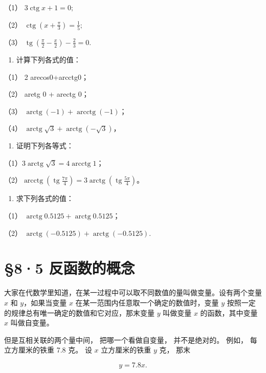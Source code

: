 （1） \(3 \operatorname{ctg} x + 1 = 0;\)

（2）
\(\operatorname{ctg}\left(x + \frac{\pi}{3}\right) = \frac{1}{5};\)

（3）
\(\operatorname{tg}\left(\frac{\pi}{2} - \frac{x}{2}\right) - \frac{2}{3} = 0.\)

\begin{enumerate}[start=3]
\item
  计算下列各式的值：
\end{enumerate}

（1） 2 arecos0+arcctg0；

（2） aretg 0 + arectg 0；

（3） \(\operatorname{arctg}(-1) + \operatorname{arcctg}(-1)\)；

（4）
\(\operatorname{arctg} \sqrt{3} + \operatorname{arctg}(-\sqrt{3})\)，

\begin{enumerate}[start=4]
\item
  证明下列各等式：
\end{enumerate}

（1）\(3\operatorname{arctg}\sqrt3=4\operatorname{arcctg}1\)；

（2）\(\operatorname{arcctg}\left(\operatorname{tg}\frac{7\pi}{4}\right)=3\operatorname{arctg}\left(\operatorname{tg}\frac{5\pi}{4}\right)\)。

\begin{enumerate}[start=5]
\item
  求下列各式的值：
\end{enumerate}

（1） \(\operatorname{arctg} 0.5125 + \operatorname{arctg} 0.5125\)；

（2） \(\operatorname{arctg}(-0.5125) + \operatorname{arctg}(-0.5125)\).

\section{§8·5 反函数的概念}

大家在代数学里知道，在某一过程中可以取不同数值的量叫做变量。设有两个变量
\(x\) 和 \(y\)，如果当变量 \(x\)
在某一范围内任意取一个确定的数值时，变量 \(y\)
按照一定的规律总有唯一确定的数值和它对应，那末变量 \(y\) 叫做变量 \(x\)
的函数，其中变量 \(x\) 叫做自变量。

但是互相关联的两个量中间， 把哪一个看做自变量， 并不是绝对的。 例如，
每立方厘米的铁重 7.8 克。 设 \(x\) 立方厘米的铁重 \(y\) 克， 那末

\[
y = 7.8 x.
\]

